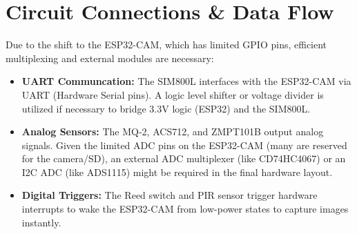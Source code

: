 \documentclass[12pt,a4paper]{article}
\begin{document}
\section{Circuit Connections \& Data Flow}
Due to the shift to the ESP32-CAM, which has limited GPIO pins, efficient multiplexing and external modules are necessary:
\begin{itemize}
    \item \textbf{UART Communcation:} The SIM800L interfaces with the ESP32-CAM via UART (Hardware Serial pins). A logic level shifter or voltage divider is utilized if necessary to bridge 3.3V logic (ESP32) and the SIM800L.
    \item \textbf{Analog Sensors:} The MQ-2, ACS712, and ZMPT101B output analog signals. Given the limited ADC pins on the ESP32-CAM (many are reserved for the camera/SD), an external ADC multiplexer (like CD74HC4067) or an I2C ADC (like ADS1115) might be required in the final hardware layout.
    \item \textbf{Digital Triggers:} The Reed switch and PIR sensor trigger hardware interrupts to wake the ESP32-CAM from low-power states to capture images instantly.
\end{itemize}
\end{document}
